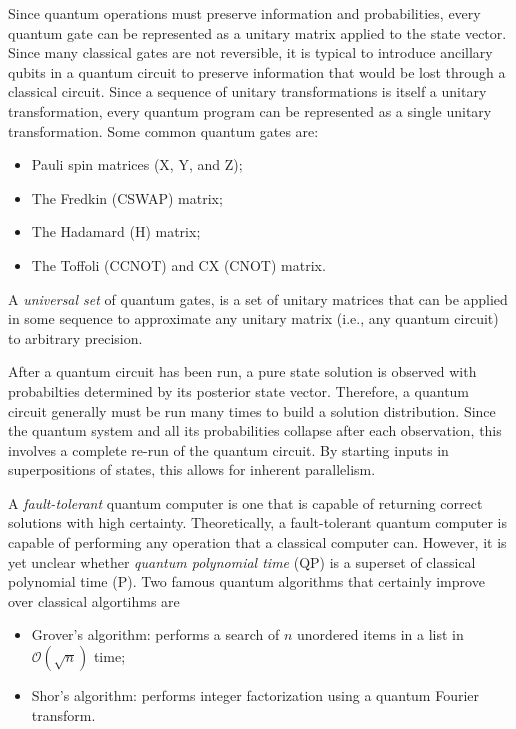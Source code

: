 \documentclass[12pt]{article}
\begin{document}
Since quantum operations must preserve information and probabilities,
every quantum gate can be represented as a unitary matrix applied to the
state vector.
Since many classical gates are not reversible, it is typical to introduce
ancillary qubits in a quantum circuit to preserve information that would
be lost through a classical circuit.
Since a sequence of unitary transformations is itself a
unitary transformation, every quantum program can be represented as a
single unitary transformation.
Some common quantum gates are:
\begin{itemize}
\item Pauli spin matrices (X, Y, and Z);
\item The Fredkin (CSWAP) matrix;
\item The Hadamard (H) matrix;
\item The Toffoli (CCNOT) and CX (CNOT) matrix.
\end{itemize}
A {\it universal set} of quantum gates, is a set of unitary matrices
that can be applied in some sequence to approximate any unitary matrix
(i.e., any quantum circuit) to arbitrary precision.

After a quantum circuit has been run, a pure state solution is observed
with probabilties determined by its posterior state vector.
Therefore, a quantum circuit generally must be run many times to build
a solution distribution.
Since the quantum system and all its probabilities collapse after each
observation, this involves a complete re-run of the quantum circuit.
By starting inputs in superpositions of states, this allows for inherent
parallelism.

A {\it fault-tolerant} quantum computer is one that is capable of
returning correct solutions with high certainty.
Theoretically, a fault-tolerant quantum computer is capable of performing
any operation that a classical computer can.
However, it is yet unclear whether {\it quantum polynomial time} (QP) is
a superset of classical polynomial time (P).
Two famous quantum algorithms that certainly improve over classical algortihms
are
\begin{itemize}
\item Grover's algorithm: performs a search of $n$ unordered items in a list
in $\mathcal{O}(\sqrt{n})$ time;
\item Shor's algorithm: performs integer factorization using a quantum
Fourier transform.
\end{itemize}
\end{document}
